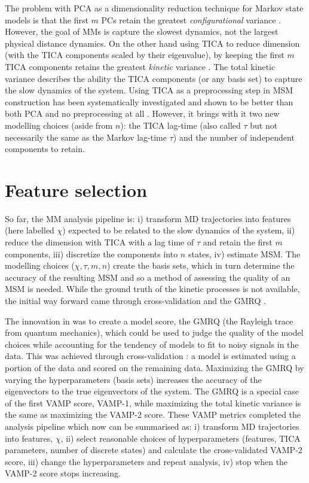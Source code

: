 The problem with PCA as a dimensionality reduction technique for Markov state models is that the first $m$ PCs retain the greatest \emph{configurational} variance \cite{friedman2001elements}. However, the goal of MMs is capture the slowest dynamics, not the largest physical distance dynamics. On the other hand using TICA to reduce dimension (with the TICA components scaled by their eigenvalue), by keeping the first $m$ TICA components retains the greatest \emph{kinetic} variance \cite{noeKineticDistanceKinetic2015}. The total kinetic variance describes the ability  the TICA components (or any basis set) to capture the slow dynamics of the system. Using TICA as a preprocessing step in MSM construction has been systematically investigated and shown to be better than both PCA and no preprocessing at all \cite{husicOptimizedParameterSelection2016}. However, it brings with it two new modelling choices (aside from $n$): the TICA lag-time (also called $\tau$ but not necessarily the same as the Markov lag-time $\tau$) and the number of independent components to retain.  

\section{Feature selection}
So far, the MM analysis pipeline is: i) transform MD trajectories into features (here labelled $\chi$) expected to be related to the slow dynamics of the system, ii) reduce the dimension with TICA with a lag time of $\tau$ and retain the first $m$ components, iii) discretize the components into $n$ states, iv) estimate MSM. The modelling choices ($\chi, \tau, m, n$) create the basis sets, which in turn determine the accuracy of the resulting MSM and so a method of assessing the quality of an MSM is needed. While the ground truth of the kinetic processes is not available, the initial way forward came through cross-validation and the GMRQ \cite{mcgibbonVariationalCrossvalidationSlow2015}. 

The innovation in \cite{mcgibbonVariationalCrossvalidationSlow2015} was to create a model score, the GMRQ (the Rayleigh trace from quantum mechanics), which could be used to judge the quality of the model choices while accounting for the tendency of models to fit to noisy signals in the data. This was achieved through cross-validation \cite{arlotSurveyCrossvalidationProcedures2009}: a model is estimated using a portion of the data and scored on the remaining data. Maximizing the GMRQ by varying the hyperparameters (basis sets) increases the accuracy of the eigenvectors to the true eigenvectors of the system. The GMRQ is a special case of the first VAMP score, VAMP-1, while maximizing the total kinetic variance is the same as maximizing the VAMP-2 score. These VAMP metrics completed the analysis pipeline \cite{schererVariationalSelectionFeatures2019} which now can be summarised as: i) transform MD trajectories into features, $\chi$, ii) select reasonable choices of  hyperparameters (features, TICA parameters, number of discrete states) and calculate the cross-validated VAMP-2 score, iii) change the hyperparameters and repeat analysis, iv) stop when the VAMP-2 score stops increasing. 

